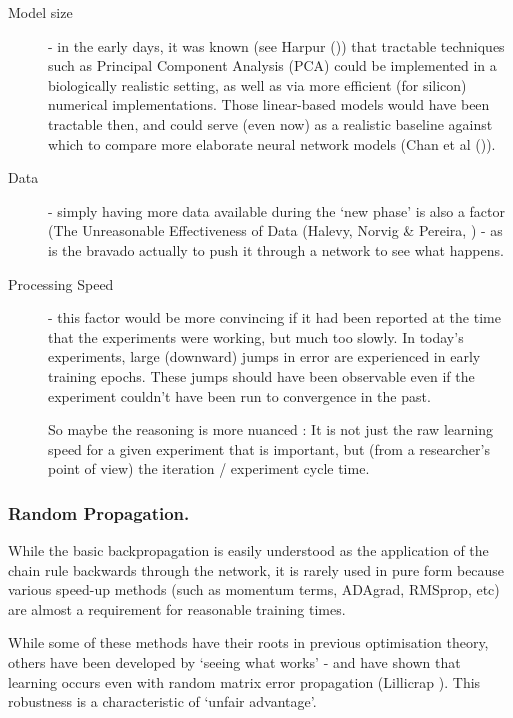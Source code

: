 \documentclass[citeauthoryear]{llncs}
\begin{document}
\begin{description}

\item[Model size] - in the early days, it was known (see Harpur (\cite{harpur-thesis})) 
that tractable techniques such as Principal Component Analysis (PCA) could be implemented 
in a biologically realistic setting, as well as via more efficient (for silicon) numerical implementations.  
Those linear-based models would have been tractable then, 
and could serve (even now) as a realistic baseline against which to compare 
more elaborate neural network models (Chan et al (\cite{PCAnet})).

\item[Data] - simply having more data available during the `new phase' 
is also a factor (The Unreasonable Effectiveness of Data (Halevy, Norvig \& Pereira, \cite{norvig-UnreasonableEffectivenessOfData})
- as is the bravado actually to push it through a network to see what happens.

\item[Processing Speed] - this factor would be more convincing if it had been reported at the time 
that the experiments were working, but much too slowly.  
In today's experiments, large (downward) jumps in error are experienced in early training epochs.  
These jumps should have been observable even if the experiment couldn't have 
been run to convergence in the past.  

So maybe the reasoning is more nuanced : It is not just the raw learning speed 
for a given experiment that is important, but 
(from a researcher's point of view) the iteration / experiment cycle time.

\end{description}


\subsubsection*{Random Propagation.}

While the basic backpropagation is easily understood as the application 
of the chain rule backwards through the network, it is rarely used in pure form
because various speed-up methods (such as momentum terms, ADAgrad, RMSprop, etc)
are almost a requirement for reasonable training times.  

While some of these methods have their roots in previous optimisation theory, 
others have been developed by `seeing what works' - and have shown that 
learning occurs even with random matrix error propagation 
(Lillicrap \cite{Lillicrap-random-matrix}).  
This robustness is a characteristic of `unfair advantage'.
\end{document}
